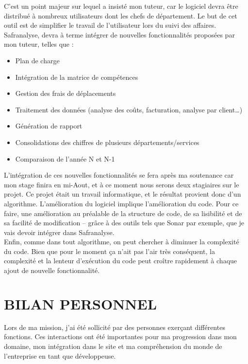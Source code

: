 C’est un point majeur sur lequel a insisté mon tuteur, car le logiciel devra être distribué à nombreux utilisateurs dont les chefs de département.
Le but de cet outil est de simplifier le travail de l’utilisateur lors du suivi des affaires.\\
Safranalyse, devra à terme intégrer de nouvelles fonctionnalités proposées par mon tuteur, telles que :
\begin{itemize}
\item Plan de charge
\item Intégration de la matrice de compétences 
\item Gestion des frais de déplacements
\item Traitement des données (analyse des coûts, facturation, analyse par client…)
\item Génération de rapport
\item Consolidations des chiffres de plusieurs départements/services
\item Comparaison de l’année N et N-1\\
\end{itemize}

L’intégration de ces nouvelles fonctionnalités se fera après ma soutenance car mon stage finira en mi-Aout, et à ce moment nous serons deux stagiaires sur le projet.
Ce projet était un travail informatique, et le résultat provient donc d’un algorithme. L’amélioration du logiciel implique l’amélioration du code. Pour ce faire, une amélioration au préalable de la structure de code, de sa lisibilité et de sa facilité de modification – grâce à des outils tels que Sonar par exemple, que je vais devoir intégrer dans Safranalyse. \\

Enfin, comme dans tout algorithme, on peut chercher à diminuer la complexité du code. Bien que pour le moment ça n’ait pas l’air très conséquent, la complexité et la lenteur d’exécution du code peut croître rapidement à chaque ajout de nouvelle fonctionnalité.

\section{BILAN PERSONNEL}
Lors de ma mission, j’ai été sollicité par des personnes exerçant différentes fonctions. Ces interactions ont été importantes pour ma progression dans mon domaine, mon intégration dans le site et ma compréhension du monde de l’entreprise en tant que développeuse.\\

